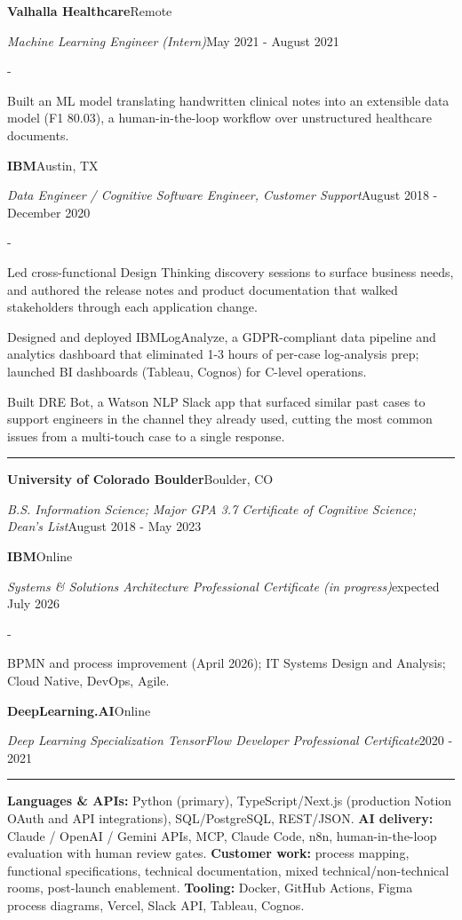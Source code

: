 \documentclass[10pt,letterpaper]{article}
\newenvironment{cvitems}{%
  \begin{list}{-}{%
    \setlength{\leftmargin}{12pt}%
    \setlength{\itemsep}{1.2pt}%
    \setlength{\parsep}{0pt}%
    \setlength{\topsep}{1.5pt}%
    \setlength{\partopsep}{0pt}%
    \setlength{\labelwidth}{6pt}%
    \setlength{\labelsep}{6pt}%
    \setlength{\itemindent}{0pt}%
  }%
}{\end{list}}
\newcommand{\cvsection}[1]{%
  \vspace{7pt}%
  \noindent{\bfseries\fontsize{11pt}{13pt}\selectfont\MakeUppercase{#1}}\par
  \vspace{1pt}%
  \noindent\rule{\textwidth}{0.4pt}\par
  \vspace{4pt}%
}
\newcommand{\cventryhead}[4]{%
  \noindent\textbf{#1}\hfill#2\par
  \vspace{0.5pt}%
  \noindent\textit{#3}\hfill#4\par
}
\newcommand{\cveduhead}[4]{%
  \noindent\textbf{#1}\hfill#2\par
  \vspace{0.5pt}%
  \noindent\textit{#3}\hfill#4\par
}
\begin{document}
\vspace{3pt}
\cventryhead{Valhalla Healthcare}{Remote}
{Machine Learning Engineer (Intern)}{May 2021 - August 2021}
\begin{cvitems}
  \item Built an ML model translating handwritten clinical notes into an extensible data model (F1 80.03), a human-in-the-loop workflow over unstructured healthcare documents.
\end{cvitems}

\vspace{3pt}
\cventryhead{IBM}{Austin, TX}
{Data Engineer / Cognitive Software Engineer, Customer Support}{August 2018 - December 2020}
\begin{cvitems}
  \item Led cross-functional Design Thinking discovery sessions to surface business needs, and authored the release notes and product documentation that walked stakeholders through each application change.
  \item Designed and deployed IBMLogAnalyze, a GDPR-compliant data pipeline and analytics dashboard that eliminated 1-3 hours of per-case log-analysis prep; launched BI dashboards (Tableau, Cognos) for C-level operations.
  \item Built DRE Bot, a Watson NLP Slack app that surfaced similar past cases to support engineers in the channel they already used, cutting the most common issues from a multi-touch case to a single response.
\end{cvitems}

\cvsection{Education}

\cveduhead{University of Colorado Boulder}{Boulder, CO}
{B.S. Information Science; Major GPA 3.7 \textbar{} Certificate of Cognitive Science; Dean's List}{August 2018 - May 2023}

\vspace{3pt}
\cveduhead{IBM}{Online}
{Systems \& Solutions Architecture Professional Certificate (in progress)}{expected July 2026}
\begin{cvitems}
  \item BPMN and process improvement (April 2026); IT Systems Design and Analysis; Cloud Native, DevOps, Agile.
\end{cvitems}

\vspace{3pt}
\cveduhead{DeepLearning.AI}{Online}
{Deep Learning Specialization \textbar{} TensorFlow Developer Professional Certificate}{2020 - 2021}

\cvsection{Skills}

{\raggedright
\noindent\textbf{Languages \& APIs:} Python (primary), TypeScript/Next.js (production Notion OAuth and API integrations), SQL/PostgreSQL, REST/JSON. \textbf{AI delivery:} Claude / OpenAI / Gemini APIs, MCP, Claude Code, n8n, human-in-the-loop evaluation with human review gates. \textbf{Customer work:} process mapping, functional specifications, technical documentation, mixed technical/non-technical rooms, post-launch enablement. \textbf{Tooling:} Docker, GitHub Actions, Figma process diagrams, Vercel, Slack API, Tableau, Cognos.\par
}
\end{document}
